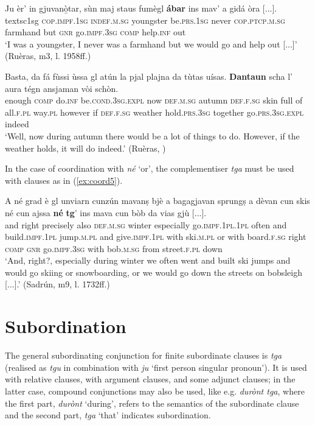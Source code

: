 \ea
\label{ex:coord3}
\gll Ju èr’ in gjuvanò̱tar, sùn maj staus fumègl \textbf{ábar} ins mav’ a gidá òra [...].\\
textsc{1sg} \textsc{cop.impf.1sg} \textsc{indef.m.sg} youngster be.\textsc{prs.1sg} never \textsc{cop.ptcp.m.sg} farmhand but \textsc{gnr} go.\textsc{impf.3sg} \textsc{comp} help.\textsc{inf} out \\
\glt `I was a youngster, I never was a farmhand but we would go and help out [...]' (Ruèras, m3, l. 1958ff.)
\z

\ea
\label{ex:coord4}
\gll Basta, da fá fùssi ùssa gl atún la pjal plajna da tùtas uísas. \textbf{Dantaun} scha l' aura tégn ansjaman vòi schòn.\\
enough \textsc{comp} do.\textsc{inf} be\textsc{.cond.3sg.expl} now \textsc{def.m.sg} autumn \textsc{def.f.sg} skin full of all.\textsc{f.pl} way.\textsc{pl} however if \textsc{def.f.sg} weather hold.\textsc{prs.3sg} together go.\textsc{prs.3sg.expl} indeed\\
\glt `Well, now during autumn there would be a lot of things to do. However, if the weather holds, it will do indeed.' (Ruèras, )
\z

In the case of coordination with \textit{né} `or', the complementiser \textit{tga} must be used with clauses as in (\ref{ex:coord5}).

\ea
\label{ex:coord5}
\gll A né grad è gl unviarn cunzún mavanṣ bjè a bagagjavan sprungṣ a dèvan cun skis né cun ajssa \textbf{né} \textbf{tg}’ ins mava cun bòb da vias gjù [...].\\
and right precisely also \textsc{def.m.sg} winter especially go.\textsc{impf.1pl.1pl} often and build.\textsc{impf.1pl} jump.\textsc{m.pl} and give.\textsc{impf.1pl} with ski.\textsc{m.pl} or with board.\textsc{f.sg} right \textsc{comp} \textsc{gnr} go.\textsc{impf.3sg} with bob.\textsc{m.sg} from street.\textsc{f.pl} down\\
\glt `And, right?, especially during winter we often went and built ski jumps and would go skiing or snowboarding, or we would go down the streets on bobsleigh [...].' (Sadrún, m9, l. 1732ff.)
\z


\section{Subordination}
The general subordinating conjunction for finite subordinate clauses is \textit{tga} (realised as \textit{tgu} in combination with \textit{ju} `first person singular pronoun'). It is used with relative clauses, with argument clauses, and some adjunct clauses; in the latter case, compound conjunctions may also be used, like e.g.  \textit{durònt tga}, where the first part, \textit{durònt} `during', refers to the semantics of the subordinate clause and the second part, \textit{tga} `that' indicates subordination.

